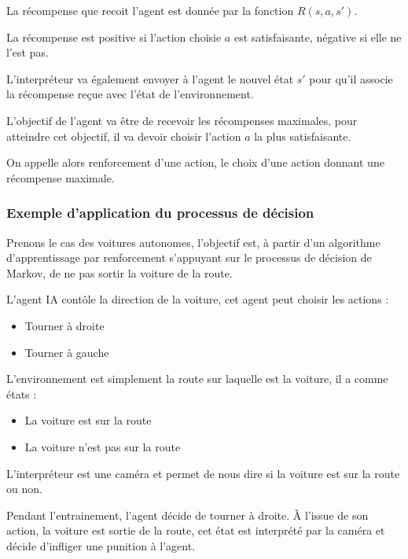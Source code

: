 \documentclass[
12pt,
french,
]{article}
\begin{document}
La récompense que recoit l'agent est donnée par la fonction
\(R(s,a,s')\).

La récompense est positive si l'action choisie \(a\) est satisfaisante,
négative si elle ne l'est pas.

L'interpréteur va également envoyer à l'agent le nouvel état \(s'\) pour
qu'il associe la récompense reçue avec l'état de l'environnement.

L'objectif de l'agent va être de recevoir les récompenses maximales,
pour atteindre cet objectif, il va devoir choisir l'action \(a\) la plus
satisfaisante.

On appelle alors renforcement d'une action, le choix d'une action
donnant une récompense maximale.

\hypertarget{exemple-dapplication-du-processus-de-duxe9cision}{%
\subsubsection{Exemple d'application du processus de
décision}\label{exemple-dapplication-du-processus-de-duxe9cision}}

Prenons le cas des voitures autonomes, l'objectif est, à partir d'un
algorithme d'apprentissage par renforcement s'appuyant sur le processus
de décision de Markov, de ne pas sortir la voiture de la route.

L'agent IA contôle la direction de la voiture, cet agent peut choisir
les actions :

\begin{itemize}
\item
  Tourner à droite
\item
  Tourner à gauche
\end{itemize}

L'environnement est simplement la route sur laquelle est la voiture, il
a comme états :

\begin{itemize}
\item
  La voiture est sur la route
\item
  La voiture n'est pas sur la route
\end{itemize}

L'interpréteur est une caméra et permet de nous dire si la voiture est
sur la route ou non.

Pendant l'entrainement, l'agent décide de tourner à droite. À l'issue de
son action, la voiture est sortie de la route, cet état est interprété
par la caméra et décide d'infliger une punition à l'agent.
\end{document}
